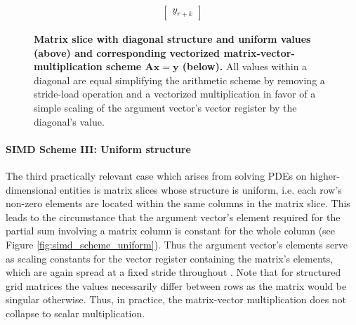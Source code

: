 \documentclass{article}
\begin{document}
\begin{figure}[ht]
$$\begin{matrix}
\begin{bmatrix}
                                                                                                                 y_{r+k}
                                                                                                                \end{bmatrix}
        \end{matrix}
        $$
        \caption[Matrix slice with diagonal structure and uniform values and corresponding vectorized matrix-vector-multiplication scheme.]{\textbf{Matrix slice with diagonal structure and uniform values (above) and corresponding vectorized matrix-vector-multiplication scheme $\bm{Ax = y}$ (below).} All values within a diagonal are equal simplifying the arithmetic scheme by removing a stride-load operation and a vectorized multiplication in favor of a simple scaling of the argument vector's vector register by the diagonal's value.}
        \label{fig:simd_scheme_diag_collated}
      \end{figure}

      \paragraph{SIMD Scheme III: Uniform structure}

      The third practically relevant case which arises from solving PDEs on higher-dimensional entities is matrix slices whose structure is uniform, i.e. each row's non-zero elements are located within the same columns in the matrix slice. This leads to the circumstance that the argument vector's element required for the partial sum involving a matrix column is constant for the whole column (see Figure \ref{fig:simd_scheme_uniform}). Thus the argument vector's elements serve as scaling constants for the vector register containing the matrix's elements, which are again spread at a fixed stride throughout \V. Note that for structured grid matrices the values necessarily differ between rows as the matrix would be singular otherwise. Thus, in practice, the matrix-vector multiplication does not collapse to scalar multiplication.
\end{document}
